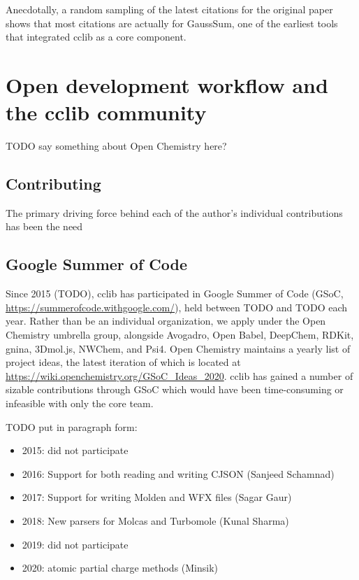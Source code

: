 \documentclass[num-refs]{wiley-article}
\begin{document}
Anecdotally, a random sampling of the latest citations for the original paper shows that most citations are actually for GaussSum, one of the earliest tools that integrated cclib as a core component.

\section{Open development workflow and the cclib community}

TODO say something about Open Chemistry here?

\subsection{Contributing}

The primary driving force behind each of the author's individual contributions has been the need

\cite{Berquist2017,Upadhyay2020}

\subsection{Google Summer of Code}

Since 2015 (TODO), cclib has participated in Google Summer of Code (GSoC, \url{https://summerofcode.withgoogle.com/}), held between TODO and TODO each year.  Rather than be an individual organization, we apply under the Open Chemistry umbrella group, alongside Avogadro, Open Babel, DeepChem, RDKit, gnina, 3Dmol.js, NWChem, and Psi4.  Open Chemistry maintains a yearly list of project ideas, the latest iteration of which is located at \url{https://wiki.openchemistry.org/GSoC_Ideas_2020}.  cclib has gained a number of sizable contributions through GSoC which would have been time-consuming or infeasible with only the core team.

TODO put in paragraph form:
\begin{itemize}
\item 2015: did not participate
\item 2016: Support for both reading and writing CJSON (Sanjeed Schamnad)
\item 2017: Support for writing Molden and WFX files (Sagar Gaur)
\item 2018: New parsers for Molcas and Turbomole (Kunal Sharma)
\item 2019: did not participate
\item 2020: atomic partial charge methods (Minsik)
\end{itemize}
\end{document}
